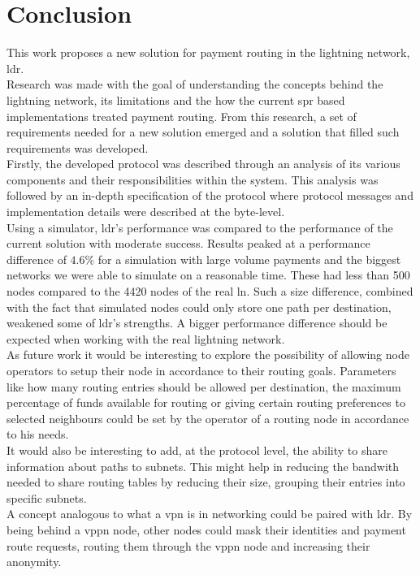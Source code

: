 \section{Conclusion}

This work proposes a new solution for payment routing in the lightning network, \acrfull{ldr}.\\
Research was made with the goal of understanding the concepts behind the lightning network, its limitations and the how the current \acrfull{spr} based implementations treated payment routing. From this research, a set of requirements needed for a new solution emerged and a solution that filled such requirements was developed.\\
Firstly, the developed protocol was described through an analysis of its various components and their responsibilities within the system. This analysis was followed by an in-depth specification of the protocol where protocol messages and implementation details were described at the byte-level.\\
Using a simulator, \acrshort{ldr}'s performance  was compared to the performance of the current solution with moderate success. Results peaked at a performance difference of $4.6\%$ for a simulation with large volume payments and the biggest networks we were able to simulate on a reasonable time. These had less than 500 nodes compared to the 4420 nodes of the real \acrshort{ln}. Such a size difference, combined with the fact that simulated nodes could only store one path per destination, weakened some of \acrshort{ldr}'s strengths. A bigger performance difference should be expected when working with the real lightning network.\\
As future work it would be interesting to explore the possibility of allowing node operators to setup their node in accordance to their routing goals. Parameters like how many routing entries should be allowed per destination, the maximum percentage of funds available for routing or giving certain routing preferences to selected neighbours could be set by the operator of a routing node in accordance to his needs.\\
It would also be interesting to add, at the protocol level, the ability to share information about paths to subnets. This might help in reducing the bandwith needed to share routing tables by reducing their size, grouping their entries into specific subnets.\\
A concept analogous to what a \acrfull{vpn} is in networking could be paired with \acrshort{ldr}. By being behind a \acrfull{vppn} node, other nodes could mask their identities and payment route requests, routing them through the \acrshort{vppn} node and increasing their anonymity.\\
